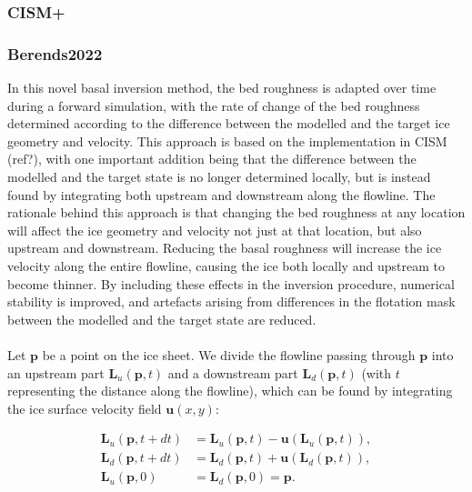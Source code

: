 \documentclass{article}
\begin{document}
\subsubsection{CISM+}

\subsubsection{Berends2022}

In this novel basal inversion method, the bed roughness is adapted over time during a forward simulation, with the rate of change of the bed roughness determined according to the difference between the modelled and the target ice geometry and velocity. This approach is based on the implementation in CISM (ref?), with one important addition being that the difference between the modelled and the target state is no longer determined locally, but is instead found by integrating both upstream and downstream along the flowline. The rationale behind this approach is that changing the bed roughness at any location will affect the ice geometry and velocity not just at that location, but also upstream and downstream. Reducing the basal roughness will increase the ice velocity along the entire flowline, causing the ice both locally and upstream to become thinner. By including these effects in the inversion procedure, numerical stability is improved, and artefacts arising from differences in the flotation mask between the modelled and the target state are reduced.\\
\\
Let $\textbf{p}$ be a point on the ice sheet. We divide the flowline passing through $\textbf{p}$ into an upstream part $\textbf{L}_u \left( \textbf{p},t \right)$ and a downstream part $\textbf{L}_d \left( \textbf{p},t \right)$ (with $t$ representing the distance along the flowline), which can be found by integrating the ice surface velocity field $\textbf{u} \left( x,y \right)$:

\begin{align}
\textbf{L}_u \left( \textbf{p},t + dt \right) &= \textbf{L}_u \left( \textbf{p},t \right) -
\textbf{u} \left( \textbf{L}_u \left( \textbf{p},t \right) \right), \\
\textbf{L}_d \left( \textbf{p},t + dt \right) &= \textbf{L}_d \left( \textbf{p},t \right) +
\textbf{u} \left( \textbf{L}_d \left( \textbf{p},t \right) \right), \\
\textbf{L}_u \left( \textbf{p},0 \right) &= \textbf{L}_d \left( \textbf{p},0 \right) = \textbf{p}.
\end{align}
\end{document}

